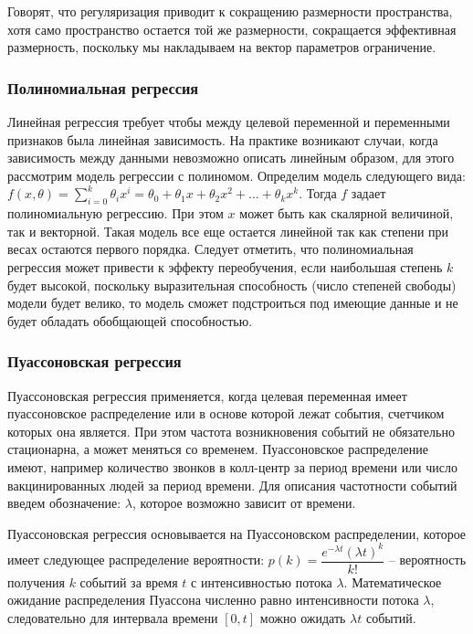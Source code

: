 Говорят, что регуляризация приводит к сокращению размерности пространства, хотя само пространство остается той же размерности, сокращается эффективная размерность, поскольку мы накладываем на вектор параметров ограничение.


\subsubsection{Полиномиальная регрессия}

Линейная регрессия требует чтобы между целевой переменной и переменными признаков была линейная зависимость. На практике возникают случаи, когда зависимость между данными невозможно описать линейным образом, для этого рассмотрим модель регрессии с полиномом. Определим модель следующего вида: $f(x,\theta) = \sum\limits_{i=0}^k \theta_i x^i = \theta_0 + \theta_1 x + \theta_2 x^2 + \dots + \theta_k x^k $. Тогда $f$ задает полиномиальную регрессию. При этом $x$ может быть как скалярной величиной, так и векторной. Такая модель все еще остается линейной так как степени при весах остаются первого порядка. Следует отметить, что полиномиальная регрессия может привести к эффекту переобучения, если наибольшая степень $k$ будет высокой, поскольку выразительная способность (число степеней свободы) модели будет велико, то модель сможет подстроиться под имеющие данные и не будет обладать обобщающей способностью.


\subsubsection{Пуассоновская регрессия}

Пуассоновская регрессия применяется, когда целевая переменная имеет пуассоновское распределение или в основе которой лежат события, счетчиком которых она является. При этом частота возникновения событий не обязательно стационарна, а может меняться со временем. Пуассоновское распределение имеют, например количество звонков в колл-центр за период времени или число вакцинированных людей за период времени. Для описания частотности событий введем обозначение: $\lambda$, которое возможно зависит от времени.

Пуассоновская регрессия основывается на Пуассоновском распределении, которое имеет следующее распределение вероятности: $p(k) = \dfrac{e^{-\lambda t} (\lambda t)^k}{k!}$ -- вероятность получения $k$ событий за время $t$ с интенсивностью потока $\lambda$. Математическое ожидание распределения Пуассона численно равно интенсивности потока $\lambda$, следовательно для интервала времени $[0, t]$ можно ожидать $\lambda t$ событий.

